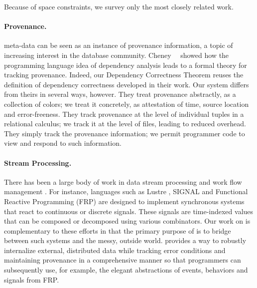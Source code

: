 
Because of space constraints, we survey only the most closely related work.

\paragraph*{Provenance.}  \padsd{} meta-data can be seen as
an instance of provenance information, a topic of increasing interest
in the database community.  Cheney~\etal{}~\cite{cheney-dbpl07} showed
how the programming language idea of dependency analysis leads to a
formal theory for tracking provenance.  Indeed, our Dependency
Correctness Theorem reuses the definition of dependency correctness
developed in their work.  Our system differs from theirs in several
ways, however.  They treat provenance abstractly, as a collection of
colors; we treat it concretely, as attestation of time, source
location and error-freeness.  They track provenance at the level of
individual tuples in a relational calculus; we track it at the level
of files, leading to reduced overhead.  They simply track the
provenance information; we permit programmer code to view and
respond to such information.

\paragraph*{Stream Processing.}
There has been a large body of work in data stream processing and work
flow management \cite{Golab03}. For instance, languages such as Lustre
\cite{CaspiPHP87}, SIGNAL \cite{AmagbegnonBG95} and Functional
Reactive Programming (FRP) \cite{ElliottH97,WanH00} are designed to
implement synchronous systems that react to continuous or discrete
signals. These signals are time-indexed values that can be composed or
decomposed using various combinators.  Our work on \padsd{} is
complementary to these efforts in that the primary purpose of \padsd{}
is to bridge between such systems and the messy, outside
world.  \padsd{} provides a way to robustly internalize external,
distributed data while tracking error conditions and maintaining
provenance in a comprehensive manner so that programmers can
subsequently use, for 
example, the elegant abstractions of events, behaviors and signals
from FRP.


